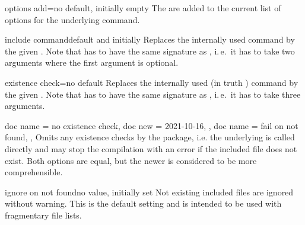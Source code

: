 \documentclass[a4paper,11pt]{ltxdoc}
\begin{document}
\begin{docIgrKey}{options add}{=}{no default, initially empty}
  The  are added to the current list of options
  for the underlying  command.
\end{docIgrKey}


\begin{docIgrKey}{include command}{}{default and initially }
  Replaces the internally used  command by the given .
  Note that  has to have the same signature as ,
  i.\,e.\ it has to take two arguments where the first argument is optional.
\end{docIgrKey}

\begin{docIgrKey}{existence check}{=}{no default}
  Replaces the internally used 
  (in truth )
  command by the given .
  Note that  has to have the same signature as ,
  i.\,e.\ it has to take three arguments.
\end{docIgrKey}

\begin{docIgrKeys}[
    doc parameter   = {},
    doc description = {no value}
  ]
  {
    {
      doc name = no existence check,
      doc new  = 2021-10-16,
    },
    {
      doc name = fail on not found,
    },
  }
  Omits any existence checks by the package, i.e. the underlying
   is called directly and may
  stop the compilation with an error if the included file does not exist.
  Both options are equal, but the newer 
  is considered to be more comprehensible.
\end{docIgrKeys}

\begin{docIgrKey}{ignore on not found}{}{no value, initially set}
  Not existing included files are ignored without warning. This is the default
  setting and is intended to be used with fragmentary file lists.
\end{docIgrKey}

\clearpage
\end{document}
